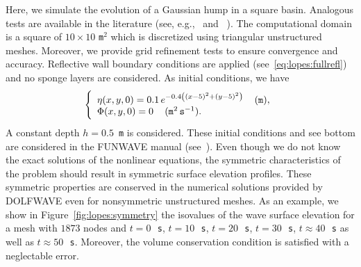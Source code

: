Here, we simulate the evolution of a Gaussian hump in a square
basin. Analogous tests are available in the literature (see,
e.g.,~\citet{WeiKirby1995} and ~\citet{WooLiu2004a}).  The
computational domain is a square of \(10\times 10\) {\tt m}\(^2\)
which is discretized using triangular unstructured meshes.  Moreover,
we provide grid refinement tests to ensure convergence and accuracy.
Reflective wall boundary conditions are applied
(see~\eqref{eq:lopes:fullrefl}) and no sponge layers are considered.
As initial conditions, we have
\begin{equation}
  \left\{
    \begin{array}{l}
      \eta(x,y,0)=0.1\,e^{-0.4\left((x-5)^2+(y-5)^2\right)}\, \quad
      {(\tt m)},\\
      \Phi(x,y,0)=0\,\quad ({\tt m}^2\,{\tt s}^{-1}).
    \end{array}
  \right.
\end{equation}
A constant depth \(h=0.5\)~{\tt m} is considered.  These initial
conditions and see bottom are considered in the FUNWAVE manual
(see~\citet{Kirby1998}).  Even though we do not know the exact
solutions of the nonlinear equations, the symmetric characteristics of
the problem should result in symmetric surface elevation profiles.
These symmetric properties are conserved in the numerical solutions
provided by DOLFWAVE even for nonsymmetric unstructured meshes.  As an
example, we show in Figure~\ref{fig:lopes:symmetry} the isovalues of
the wave surface elevation for a mesh with $1873$ nodes and
$t=0$\,~{\tt s}, $t=10$\,~{\tt s}, $t=20$\,~{\tt s}, $t=30$\,~{\tt s},
$t\approx 40$\,~{\tt s} as well as $t\approx 50$\,~{\tt s}.  Moreover,
the volume conservation condition is satisfied with a neglectable
error.

